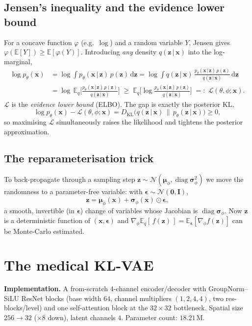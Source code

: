\documentclass[12pt,a4paper]{article}
\theoremstyle{definition}
\theoremstyle{plain}
\newcommand{\E}{\mathbb{E}}
\newcommand{\N}{\mathcal{N}}
\newcommand{\KL}{D_{\mathrm{KL}}}
\newcommand{\x}{\bm{x}}
\newcommand{\z}{\bm{z}}
\newcommand{\eps}{\bm{\epsilon}}
\newcommand{\II}{\mathbf{I}}
\newcommand{\given}{\,\vert\,}
\newcommand{\dd}{\,\mathrm{d}}
\DeclareMathOperator{\diag}{diag}
\begin{document}
\subsection{Jensen's inequality and the evidence lower bound}
For a concave function $\varphi$ (e.g.\ $\log$) and a random variable $Y$,
Jensen gives $\varphi(\E[Y])\ge \E[\varphi(Y)]$. Introducing \emph{any} density
$q(\z\given\x)$ into the log-marginal,
\begin{align}
\log p_\theta(\x)
&=\log\!\int p_\theta(\x\given\z)\,p(\z)\dd\z
 =\log\!\int q(\z\given\x)\,\frac{p_\theta(\x\given\z)\,p(\z)}{q(\z\given\x)}\dd\z\\
&=\log\,\E_{q}\!\Big[\frac{p_\theta(\x\given\z)\,p(\z)}{q(\z\given\x)}\Big]
 \;\ge\;\E_{q}\!\Big[\log\frac{p_\theta(\x\given\z)\,p(\z)}{q(\z\given\x)}\Big]
 \;=:\;\mathcal L(\theta,\phi;\x).
\label{eq:elbo-jensen}
\end{align}
$\mathcal L$ is the \emph{evidence lower bound} (ELBO). The gap is exactly the
posterior KL,
\begin{equation}
\log p_\theta(\x)-\mathcal L(\theta,\phi;\x)
=\KL\!\big(q(\z\given\x)\,\|\,p_\theta(\z\given\x)\big)\ge0,
\label{eq:elbo-gap}
\end{equation}
so maximising $\mathcal L$ simultaneously raises the likelihood and tightens the
posterior approximation.

\subsection{The reparameterisation trick}
To back-propagate through a sampling step $\z\sim\N(\bm\mu_\phi,\diag\bm\sigma_\phi^2)$
we move the randomness to a parameter-free variable: with $\eps\sim\N(\bm0,\II)$,
\begin{equation}
\z=\bm\mu_\phi(\x)+\bm\sigma_\phi(\x)\odot\eps,
\label{eq:reparam}
\end{equation}
a smooth, invertible (in $\eps$) change of variables whose Jacobian is
$\diag\bm\sigma_\phi$. Now $\z$ is a deterministic function of $(\x,\eps)$ and
$\nabla_\phi\E_{q}[\,f(\z)\,]=\E_{\eps}[\nabla_\phi f(\z)]$ can be Monte-Carlo
estimated.

\section{The medical KL-VAE}
\label{sec:vae}
\textbf{Implementation.} A from-scratch 4-channel encoder/decoder with GroupNorm--
SiLU ResNet blocks (base width $64$, channel multipliers $(1,2,4,4)$, two
res-blocks/level) and one self-attention block at the $32{\times}32$ bottleneck.
Spatial size $256\to32$ ($\times8$ down), latent channels $4$. Parameter count:
$18.21$\,M.
\end{document}
